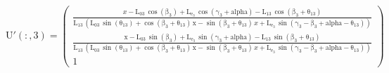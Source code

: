 \documentclass[]{article}
\begin{document}
\begin{equation*}
\mathrm{U'(:, 3)} = \left(\begin{array}{c} \frac{x - \mathrm{\mathrm{L_{03}}}\, \cos\!\left(\mathrm{\mathrm{\beta_3}}\right) + \mathrm{\mathrm{L_{e_3}}}\, \cos\!\left(\mathrm{\mathrm{\gamma_3}} + \mathrm{alpha}\right) - \mathrm{\mathrm{L_{13}}}\, \cos\!\left(\mathrm{\mathrm{\beta_3}} + \mathrm{\theta_{13}}\right)}{\mathrm{\mathrm{L_{13}}}\, \left(\mathrm{\mathrm{L_{03}}}\, \sin\!\left(\mathrm{\theta_{13}}\right) + \cos\!\left(\mathrm{\mathrm{\beta_3}} + \mathrm{\theta_{13}}\right)\, \mathrm{x} - \sin\!\left(\mathrm{\mathrm{\beta_3}} + \mathrm{\theta_{13}}\right)\, x + \mathrm{\mathrm{L_{e_3}}}\, \sin\!\left(\mathrm{\mathrm{\gamma_3}} - \mathrm{\mathrm{\beta_3}} + \mathrm{alpha} - \mathrm{\theta_{13}}\right)\right)}\\ \frac{\mathrm{x} - \mathrm{\mathrm{L_{03}}}\, \sin\!\left(\mathrm{\mathrm{\beta_3}}\right) + \mathrm{\mathrm{L_{e_3}}}\, \sin\!\left(\mathrm{\mathrm{\gamma_3}} + \mathrm{alpha}\right) - \mathrm{\mathrm{L_{13}}}\, \sin\!\left(\mathrm{\mathrm{\beta_3}} + \mathrm{\theta_{13}}\right)}{\mathrm{\mathrm{L_{13}}}\, \left(\mathrm{\mathrm{L_{03}}}\, \sin\!\left(\mathrm{\theta_{13}}\right) + \cos\!\left(\mathrm{\mathrm{\beta_3}} + \mathrm{\theta_{13}}\right)\, \mathrm{x} - \sin\!\left(\mathrm{\mathrm{\beta_3}} + \mathrm{\theta_{13}}\right)\, x + \mathrm{\mathrm{L_{e_3}}}\, \sin\!\left(\mathrm{\mathrm{\gamma_3}} - \mathrm{\mathrm{\beta_3}} + \mathrm{alpha} - \mathrm{\theta_{13}}\right)\right)}\\ 1 \end{array}\right)
\end{equation*}

\newpage

\printbibliography  
\end{document}

